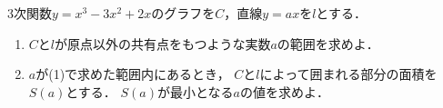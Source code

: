 \documentclass[../../main.tex]{subfiles}
\begin{document}
3次関数$y=x^3-3x^2+2x$のグラフを$C$，直線$y=ax$を$l$とする．
\begin{enumerate}
  \item $C$と$l$が原点以外の共有点をもつような実数$a$の範囲を求めよ．
  \item $a$が(1)で求めた範囲内にあるとき，
    $C$と$l$によって囲まれる部分の面積を$S(a)$とする．
    $S(a)$が最小となる$a$の値を求めよ．
\end{enumerate}
\end{document}
